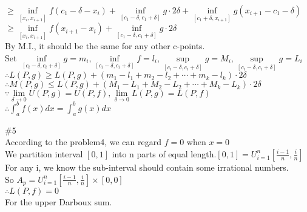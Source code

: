 \documentclass{article}
\begin{document}
\qquad$\displaystyle\geq\inf \limits_{[x_i,x_{i+1}]}f(c_1-\delta-x_i)+\inf \limits_{[c_1-\delta,c_1+\delta]}g\cdot2\delta+\inf \limits_{[c_1+\delta,x_{i+1}]}g(x_{i+1}-c_1-\delta)$\\

\qquad$\displaystyle\geq\inf \limits_{[x_i,x_{i+1}]}f(x_{i+1}-x_i)+\inf \limits_{[c_1-\delta,c_1+\delta]}g\cdot2\delta$\\

By M.I., it should be the same for any other c-points.\\

Set $\displaystyle\inf \limits_{[c_i-\delta,c_i+\delta]}g=m_i, \inf \limits_{[c_i-\delta,c_i+\delta]}f=l_i, \sup \limits_{[c_i-\delta,c_i+\delta]}g=M_i, \sup \limits_{[c_i-\delta,c_i+\delta]}g=L_i$\\

$\therefore$\qquad$\displaystyle L(P,g)\geq L(P,g)+(m_1-l_1+m_2-l_2+\cdots+m_k-l_k)\cdot2\delta$\\

$\therefore$\qquad$\displaystyle M(P,g)\leq L(P,g)+(M_1-L_1+M_2-L_2+\cdots+M_k-L_k)\cdot2\delta$\\

$\because$\qquad$\displaystyle\lim \limits_{\delta \to 0}U(P,g)=U(P,f), \displaystyle\lim \limits_{\delta \to 0}L(P,g)=L(P,f) $\\

$\therefore$\qquad$\int_a^bf(x)dx=\int_a^bg(x)dx$\\

\vskip 2cm

\textcolor[rgb]{0.00,0.00,0.50}{\#5}\\

According to the problem4, we can regard $f = 0$ when $x = 0$\\

We partition interval $[0,1]$ into n parts of equal length.\qquad $\displaystyle[0,1]=U_{i=1}^n\left[\frac{i-1}{n},\frac{i}{n}\right]$\\

For any i, we know the sub-interval should contain some irrational numbers.\\

So $\displaystyle A_p=U_{i=1}^n\left[\frac{i-1}{n},\frac{i}{n}\right]\times[0,0]$\\

$\therefore$\qquad$L(P,f)=0$\\

For the upper Darboux sum.\\
\end{document}
